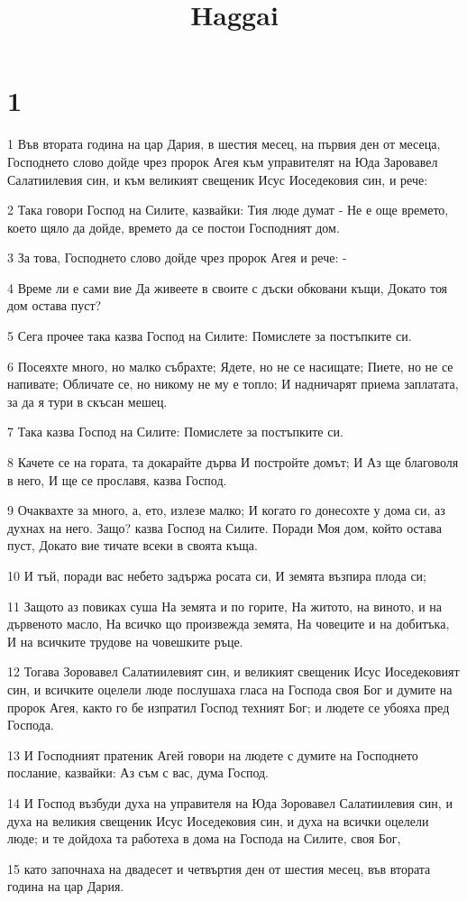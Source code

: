 

\title{Haggai}


\chapter{1}

\par 1 Във втората година на цар Дария, в шестия месец, на първия ден от месеца, Господнето слово дойде чрез пророк Агея към управителят на Юда Заровавел Салатиилевия син, и към великият свещеник Исус Иоседековия син, и рече:
\par 2 Така говори Господ на Силите, казвайки: Тия люде думат - Не е още времето,  което щяло да дойде, времето да се постои Господният дом.
\par 3 За това, Господнето слово дойде чрез пророк Агея и рече: -
\par 4 Време ли е сами вие Да живеете в своите с дъски обковани къщи, Докато тоя дом остава пуст?
\par 5 Сега прочее така казва Господ на Силите: Помислете за постъпките си.
\par 6 Посеяхте много, но малко събрахте; Ядете, но не се насищате; Пиете, но не се напивате; Обличате се, но никому не му е топло; И надничарят приема заплатата, за да я тури в скъсан мешец.
\par 7 Така казва Господ на Силите: Помислете за постъпките си.
\par 8 Качете се на гората, та докарайте дърва И постройте домът; И Аз ще благоволя в него, И ще се прославя, казва Господ.
\par 9 Очаквахте за много, а, ето, излезе малко; И когато го донесохте у дома си, аз духнах на него. Защо? казва Господ на Силите. Поради Моя дом, който остава пуст, Докато вие тичате всеки в своята къща.
\par 10 И тъй, поради вас небето задържа росата си, И земята възпира плода си;
\par 11 Защото аз повиках суша На земята и по горите, На житото, на виното, и на дървеното масло, На всичко що произвежда земята, На човеците и на добитъка, И на всичките трудове на човешките  ръце.
\par 12 Тогава Зоровавел Салатиилевият син, и великият свещеник Исус Иоседековият син, и всичките оцелели люде послушаха гласа на Господа своя Бог и думите на пророк Агея, както го бе изпратил Господ техният Бог; и людете се убояха пред Господа.
\par 13 И Господният пратеник Агей говори на людете с думите на Господнето послание, казвайки: Аз съм с вас, дума Господ.
\par 14 И Господ възбуди духа на управителя на Юда Зоровавел Салатиилевия син, и духа на великия свещеник Исус Иоседековия син, и духа на всички оцелели люде; и те дойдоха та работеха в дома на Господа на Силите, своя Бог,
\par 15 като започнаха на двадесет и четвъртия ден от шестия месец, във втората година на цар Дария.


